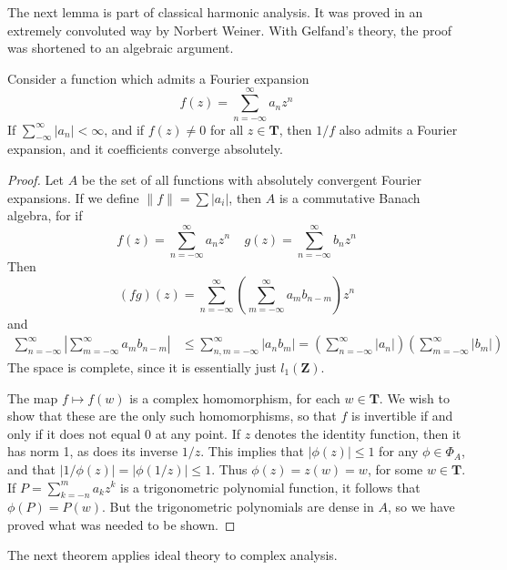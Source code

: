 The next lemma is part of classical harmonic analysis. It was proved in an extremely convoluted way by Norbert Weiner. With Gelfand's theory, the proof was shortened to an algebraic argument.

\begin{lemma}
    Consider a function which admits a Fourier expansion
    \[ f(z) = \sum_{n = -\infty}^\infty a_n z^n \]
    If $\sum_{-\infty}^\infty |a_n| < \infty$, and if $f(z) \neq 0$ for all $z \in \mathbf{T}$, then $1/f$ also admits a Fourier expansion, and it coefficients converge absolutely.
\end{lemma}
\begin{proof}
    Let $A$ be the set of all functions with absolutely convergent Fourier expansions. If we define $\| f \| = \sum |a_i|$, then $A$ is a commutative Banach algebra, for if
    \[ f(z) = \sum_{n = -\infty}^\infty a_n z^n\ \ \ \ \ g(z) = \sum_{n = -\infty}^\infty b_n z^n \]
    Then
    \[ (fg)(z) = \sum_{n = -\infty}^\infty \left ( \sum_{m = -\infty}^\infty a_m b_{n-m} \right) z^n \]
    and
    \begin{align*}
        \sum_{n = -\infty}^\infty \left| \sum_{m = -\infty}^\infty a_m b_{n-m} \right| &\leq \sum_{n,m = -\infty}^\infty |a_n b_m| = \left( \sum_{n = -\infty}^\infty |a_n| \right) \left( \sum_{m = -\infty}^\infty |b_m| \right)
    \end{align*}
    The space is complete, since it is essentially just $l_1(\mathbf{Z})$.

    The map $f \mapsto f(w)$ is a complex homomorphism, for each $w \in \mathbf{T}$. We wish to show that these are the only such homomorphisms, so that $f$ is invertible if and only if it does not equal 0 at any point. If $z$ denotes the identity function, then it has norm 1, as does its inverse $1/z$. This implies that $|\phi(z)| \leq 1$ for any $\phi \in \Phi_A$, and that $|1/\phi(z)| = |\phi(1/z)| \leq 1$. Thus $\phi(z) = z(w) = w$, for some $w \in \mathbf{T}$. If $P = \sum_{k = -n}^m a_k z^k$ is a trigonometric polynomial function, it follows that $\phi(P) = P(w)$. But the trigonometric polynomials are dense in $A$, so we have proved what was needed to be shown.
\end{proof}

The next theorem applies ideal theory to complex analysis.

